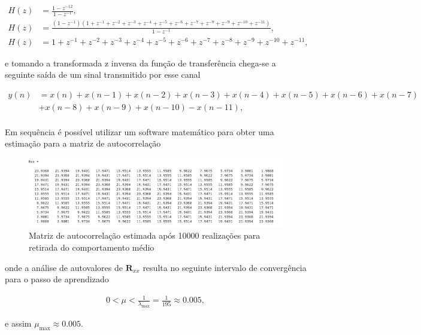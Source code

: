 \documentclass[a4paper,10pt]{article}
\begin{document}
\begin{enumerate}
\begin{enumerate}
						\begin{align*}
							H(z) &= \frac{1 - z^{-12}}{1 - z^{-1}}, \\
							H(z) &= \frac{(1 - z^{-1})(1 + z^{-1} + z^{-2} + z^{-3} + z^{-4} + z^{-5} + z^{-6} + z^{-7} + z^{-8} + z^{-9} + z^{-10} + z^{-11})}{1 - z^{-1}}, \\
							H(z) &= 1 + z^{-1} + z^{-2} + z^{-3} + z^{-4} + z^{-5} + z^{-6} + z^{-7} + z^{-8} + z^{-9} + z^{-10} + z^{-11},
						\end{align*}

						e tomando a transformada z inversa da função de transferência chega-se a seguinte saída de um sinal transmitido por esse canal

						\begin{align*}
							y(n) &= x(n) + x(n-1) + x(n-2) + x(n-3) + x(n-4) + x(n-5) + x(n-6) + x(n-7) \\
							&+ x(n-8) + x(n-9) + x(n-10) - x(n-11), 
						\end{align*}

						\paragraph{}Em sequência é possível utilizar um software matemático para obter uma estimação para a matriz de autocorrelação

						\begin{figure}[H]
							\centering
							\includegraphics[width=1\textwidth]{figs/Rxx.png}
						\caption{Matriz de autocorrelação estimada após 10000 realizações para retirada do comportamento médio}
						\label{fig:rxx}
						\end{figure}

						onde a análise de autovalores de $\mathbf{R}_{xx}$ resulta no seguinte intervalo de convergência para o passo de 
						aprendizado

						\begin{align}
							0 < \mu < \frac{1}{\lambda_{\text{max}}} = \frac{1}{195} \approx 0.005,
						\end{align}

						e assim $\mu_{\text{max}} \approx 0.005$.


\end{enumerate}
\end{enumerate}
\end{document}
